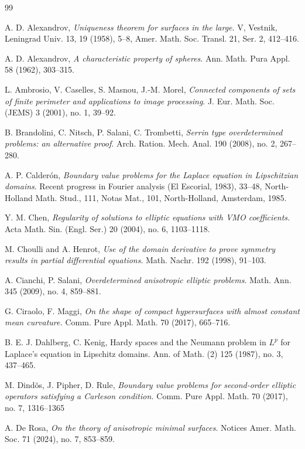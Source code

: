 \documentclass[reqno,11pt]{amsart}
\numberwithin{equation}{section}
\theoremstyle{remark}
\begin{document}
\begin{thebibliography}{99}

A. D. Alexandrov, \emph{Uniqueness theorem for surfaces in the large}. V, Vestnik, Leningrad Univ. 13, 19 (1958), 5--8, Amer. Math. Soc. Transl. 21, Ser. 2, 412--416.

A. D. Alexandrov, \emph{A characteristic property of spheres}. Ann. Math. Pura Appl. 58 (1962), 303--315.

 L. Ambrosio, V. Caselles, S. Masnou, J.-M. Morel, \emph{Connected components of sets of finite perimeter and applications to image processing}. J. Eur. Math. Soc. (JEMS) 3 (2001),  no. 1, 39--92.

B. Brandolini, C. Nitsch, P. Salani, C. Trombetti, \emph{Serrin type overdetermined problems: an alternative proof}. Arch. Ration. Mech. Anal. 190 (2008), no. 2, 267--280.


A. P. Calder\'on,  
\emph{Boundary value problems for the Laplace equation in Lipschitzian domains}. Recent progress in Fourier analysis (El Escorial, 1983), 33--48,
North-Holland Math. Stud., 111, Notas Mat., 101, North-Holland, Amsterdam, 1985.

 Y. M. Chen, \emph{Regularity of solutions to elliptic equations with VMO coefficients.} 
Acta Math. Sin. (Engl. Ser.) 20 (2004), no. 6, 1103--1118.

 M. Choulli and A. Henrot, \emph{Use of the domain derivative to prove symmetry results in partial differential
 equations}. Math. Nachr. 192 (1998), 91--103.

A. Cianchi, P. Salani, \emph{Overdetermined anisotropic elliptic problems}. Math. Ann. 345 (2009), no. 4, 859--881.

G. Ciraolo, F. Maggi, {\em On the shape of compact hypersurfaces with almost constant mean curvature.} Comm.
 Pure Appl. Math. 70 (2017), 665--716.

B. E. J. Dahlberg, C.  Kenig,  
Hardy spaces and the Neumann problem in $L^p$ for Laplace's equation in Lipschitz domains.
Ann. of Math. (2) 125 (1987), no. 3, 437--465.

M. Dind\u{o}s, J. Pipher, D. Rule, \emph{Boundary value problems for second-order elliptic operators satisfying a Carleson condition.}
Comm. Pure Appl. Math. 70 (2017), no. 7, 1316--1365

A. De Rosa,  \emph{On the theory of anisotropic minimal surfaces}. Notices Amer. Math. Soc. 71 (2024), no. 7, 853--859.



\end{thebibliography}
\end{document}
